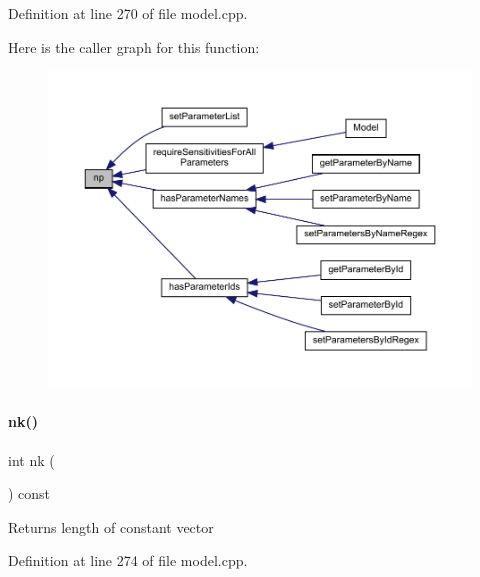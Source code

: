 Definition at line 270 of file model.\+cpp.

Here is the caller graph for this function\+:
\nopagebreak
\begin{figure}[H]
\begin{center}
\leavevmode
\includegraphics[width=350pt]{classamici_1_1_model_ae296546c9fd4d7c4ad3b7000aa9e22ef_icgraph}
\end{center}
\end{figure}
\mbox{\label{classamici_1_1_model_a3d4130da64883565a06a86e7d6029da1}} 
\paragraph{\texorpdfstring{nk()}{nk()}}
{\footnotesize\ttfamily int nk (\begin{DoxyParamCaption}{ }\end{DoxyParamCaption}) const}

\begin{DoxyReturn}{Returns}
length of constant vector 
\end{DoxyReturn}


Definition at line 274 of file model.\+cpp.

